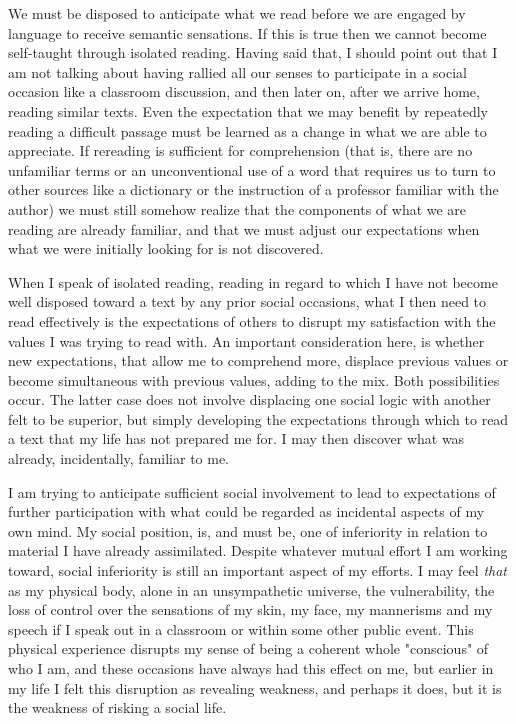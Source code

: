 \documentclass[
]{memoir}
\begin{document}
We must be disposed to anticipate what we read before we are engaged by
language to receive semantic sensations. If this is true then we cannot
become self-taught through isolated reading. Having said that, I should
point out that I am not talking about having rallied all our senses to
participate in a social occasion like a classroom discussion, and then
later on, after we arrive home, reading similar texts. Even the
expectation that we may benefit by repeatedly reading a difficult
passage must be learned as a change in what we are able to appreciate.
If rereading is sufficient for comprehension (that is, there are no
unfamiliar terms or an unconventional use of a word that requires us to
turn to other sources like a dictionary or the instruction of a
professor familiar with the author) we must still somehow realize that
the components of what we are reading are already familiar, and that we
must adjust our expectations when what we were initially looking for is
not discovered.

When I speak of isolated reading, reading in regard to which I have not
become well disposed toward a text by any prior social occasions, what I
then need to read effectively is the expectations of others to disrupt
my satisfaction with the values I was trying to read with. An important
consideration here, is whether new expectations, that allow me to
comprehend more, displace previous values or become simultaneous with
previous values, adding to the mix. Both possibilities occur. The latter
case does not involve displacing one social logic with another felt to
be superior, but simply developing the expectations through which to
read a text that my life has not prepared me for. I may then discover
what was already, incidentally, familiar to me.

I am trying to anticipate sufficient social involvement to lead to
expectations of further participation with what could be regarded as
incidental aspects of my own mind. My social position, is, and must be,
one of inferiority in relation to material I have already assimilated.
Despite whatever mutual effort I am working toward, social inferiority
is still an important aspect of my efforts. I may feel \emph{that} as my
physical body, alone in an unsympathetic universe, the vulnerability,
the loss of control over the sensations of my skin, my face, my
mannerisms and my speech if I speak out in a classroom or within some
other public event. This physical experience disrupts my sense of being
a coherent whole "conscious" of who I am, and these occasions have
always had this effect on me, but earlier in my life I felt this
disruption as revealing weakness, and perhaps it does, but it is the
weakness of risking a social life.
\end{document}
